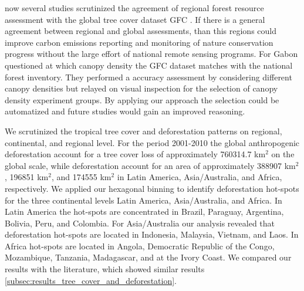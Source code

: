 now several studies scrutinized the agreement of regional forest resource assessment with the global tree cover dataset \ac{GFC} \citep{Sannier2016,McRoberts2016,Gross2017}. If there is a general agreement between regional and global assessments, than this regions could improve carbon emissions reporting and monitoring of nature conservation progress without the large effort of national remote sensing programs. For Gabon \citeauthor{Sannier2016} questioned at which canopy density the \ac{GFC} dataset matches with the national forest inventory. They performed a accuracy assessment by considering different canopy densities but relayed on visual inspection for the selection of canopy density experiment groups. By applying our approach the selection could be automatized and future studies would gain an improved reasoning.

		We scrutinized the tropical tree cover and deforestation patterns on regional, continental, and regional level. For the period 2001-2010 the global anthropogenic deforestation account for a tree cover loss of approximately 760314.7 km$^2$ on the global scale, while deforestation account for an area of approximately 388907 km$^2$, 196851 km$^2$, and 174555 km$^2$ in Latin America, Asia/Australia, and Africa, respectively. We applied our hexagonal binning to identify deforestation hot-spots for the three continental levels Latin America, Asia/Australia, and Africa. In Latin America the hot-spots are concentrated in Brazil, Paraguay, Argentina, Bolivia, Peru, and Colombia. For Asia/Australia our analysis revealed that deforestation hot-spots are located in Indonesia, Malaysia, Vietnam, and Laos. In Africa hot-spots are located in Angola, Democratic Republic of the Congo, Mozambique, Tanzania, Madagascar, and at the Ivory Coast. We compared our results with the literature, which showed similar results \ref{subsec:results_tree_cover_and_deforestation}.


